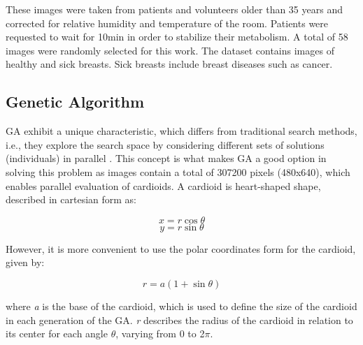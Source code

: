 \documentclass[conference]{IEEEtran}
\begin{document}
These images were taken from patients and volunteers older than 35 years and corrected for relative humidity and temperature of the room. Patients were requested to wait for 10min in order to stabilize their metabolism. A total of 58 images were randomly selected for this work. The dataset contains images of healthy and sick breasts. Sick breasts include breast diseases such as cancer.


\subsection{Genetic Algorithm}

GA exhibit a unique characteristic, which differs from traditional search methods, i.e., they explore the search space by considering different sets of solutions (individuals) in parallel \cite{ref03}. This concept is what makes GA a good option in solving this problem as images contain a total of 307200 pixels (480x640), which enables parallel evaluation of cardioids. A cardioid is heart-shaped shape, described in cartesian form as:

\begin{equation}
\label{eq:carteX}
    x = r \cos \theta
\end{equation}
\begin{equation}
\label{eq:carteY}
    y = r \sin \theta
\end{equation}

However, it is more convenient to use the polar coordinates form for the cardioid, given by:

\begin{equation}
    \label{eq:polarCard}
    r = a ( 1 + \sin \theta)
\end{equation}

\noindent
where \textit{a} is the base of the cardioid, which is used to define the size of the cardioid in each generation of the GA. \textit{r} describes the radius of the cardioid in relation to its center for each angle $\theta$, varying from 0 to 2$\pi$. %
\end{document}
